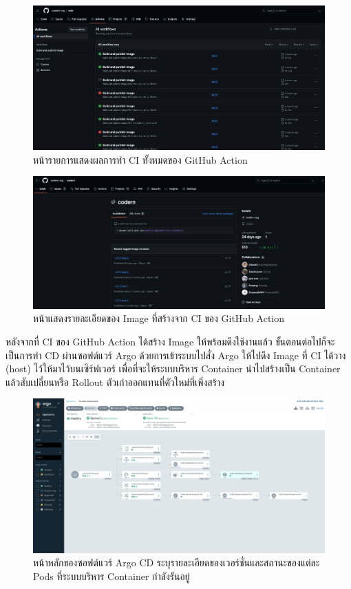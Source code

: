 \documentclass[12pt,one side,openright,a4paper]{cpe-thesis-th}
\newcommand{\thaijustify}[1]{%
  \par\hspace{30pt}\justifying
  #1
}
\begin{document}
\begin{figure}[H]
  \centering
  \includegraphics[width=12cm]{figure/results/gh-action-ci.png}
  \caption[หน้ารายการผลการทำ CI ทั้งหมดของ GitHub Actions]{หน้ารายการแสดงผลการทำ CI ทั้งหมดของ GitHub Action}
  \label{fig:res-gh-action-ci}
\end{figure}
\begin{figure}[H]
  \centering
  \includegraphics[width=12cm]{figure/results/gh-action-pkg.png}
  \caption[Image ของซอฟต์แวร์จากการทำ CI ของ GitHub Action]{หน้าแสดงรายละเอียดของ Image ที่สร้างจาก CI ของ GitHub Action}
  \label{fig:res-gh-action-pkg}
\end{figure}
\thaijustify{
  หลังจากที่ CI ของ GitHub Action ได้สร้าง Image ให้พร้อมดึงใช้งานแล้ว ขั้นตอนต่อไปก็จะเป็นการทำ CD ผ่านซอฟต์แวร์ Argo ด้วยการเข้าระบบไปสั่ง Argo ให้ไปดึง Image ที่ CI ได้วาง (host) ไว้ให้มาไว้บนเซิร์ฟเวอร์ เพื่อที่จะให้ระบบบริหาร Container นำไปสร้างเป็น Container แล้วสับเปลี่ยนหรือ Rollout ตัวเก่าออกแทนที่ตัวใหม่ที่เพิ่งสร้าง
}
\begin{figure}[H]
  \centering
  \includegraphics[width=12cm]{figure/results/argo.png}
  \caption[หน้าของซอฟต์แวร์ Argo CD]{หน้าหลักของซอฟต์แวร์ Argo CD ระบุรายละเอียดของเวอร์ชั่นและสถานะของแต่ละ Pods ที่ระบบบริหาร Container กำลังรันอยู่}
  \label{fig:res-argo}
\end{figure}
\end{document}
